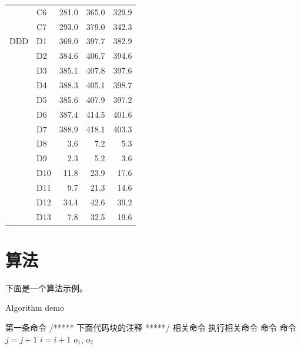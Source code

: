\begin{center}
\begin{longtable}{llrrr}
      &	C6	&	281.0	&	365.0	&	329.9	\\
      &	C7	&	293.0	&	379.0	&	342.3	\\
  DDD	&	D1	&	369.0	&	397.7	&	382.9	\\
      &	D2	&	384.6	&	406.7	&	394.6	\\
      &	D3	&	385.1	&	407.8	&	397.6	\\
      &	D4	&	388.3	&	405.1	&	398.7	\\
      &	D5	&	385.6	&	407.9	&	397.2	\\
      &	D6	&	387.4	&	414.5	&	401.6	\\
      &	D7	&	388.9	&	418.1	&	403.3	\\
      &	D8 	&	3.6	&	7.2	&	5.3	\\
      &	D9 	&	2.3	&	5.2	&	3.6	\\
      &	D10	&	11.8	&	23.9	&	17.6	\\
      &	D11	&	9.7	&	21.3	&	14.6	\\
      &	D12	&	34.4	&	42.6	&	39.2	\\
      &	D13	&	7.8	&	32.5	&	19.6	\\
  \bottomrule
  \end{longtable}
\end{center}%



\section{算法}\label{c1sec:algorithm}

下面是一个算法示例。

\begin{algorithm*}[!ht]
{Algorithm demo}	
\label{c1alg_demo}
\begin{algorithmic}[1]
\State    第一条命令           
  \State /***** 下面代码块的注释 *****/
  \State 相关命令 
   
      \State 执行相关命令 
  \EndIf
      \State 命令   
  \Else	
      \State  命令   
  \EndIf
\EndWhile
\Repeat
    \State   $j=j+1$ 
      \State $i=i+1$
\EndFor
\State \Return $o_1$, $o_2$
\end{algorithmic}
\end{algorithm*}



